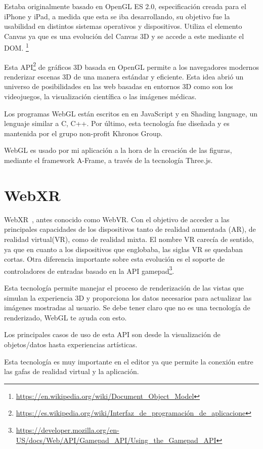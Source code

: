 \documentclass[a4paper, 12pt]{book}
\begin{document}
Estaba originalmente basado en OpenGL ES 2.0, especificación creada para el iPhone y iPad, a medida que esta se iba desarrollando, su objetivo fue la usabilidad en distintos sistemas operativos y dispositivos. Utiliza el elemento Canvas ya que es una evolución del Canvas 3D y se accede a este mediante el DOM. \footnote{\url{https://en.wikipedia.org/wiki/Document_Object_Model}}

Esta API\footnote{\url{https://es.wikipedia.org/wiki/Interfaz_de_programación_de_aplicacione}} de gráficos 3D basada en OpenGL permite a los navegadores modernos renderizar escenas 3D de una manera estándar y eficiente. Esta idea abrió un universo de posibilidades en las web basadas en entornos 3D como son los videojuegos, la visualización científica o las imágenes médicas. 

Los programas WebGL están escritos en en JavaScript y en Shading language, un lenguaje similar a C, C++. Por último, esta tecnología fue diseñada y es mantenida por el grupo non-profit Khronos Group.

WebGL es usado por mi aplicación a la hora de la creación de las figuras, mediante el framework A-Frame, a través de la tecnología Three.js.

\section{WebXR} %
\label{sec:WebXR}
WebXR~\cite{webXR}, antes conocido como WebVR. Con el objetivo de acceder a las principales capacidades de los dispositivos tanto de realidad aumentada (AR), de realidad virtual(VR), como de realidad mixta. El nombre VR carecía de sentido, ya que en cuanto a los dispositivos que englobaba, las siglas VR se quedaban cortas. Otra diferencia importante sobre esta evolución es el soporte de controladores de entradas basado en la API gamepad\footnote{\url{https://developer.mozilla.org/en-US/docs/Web/API/Gamepad_API/Using_the_Gamepad_API}}.

Esta tecnología permite manejar el proceso de renderización de las vistas que simulan la experiencia 3D y proporciona los datos necesarios para actualizar las imágenes mostradas al usuario. Se debe tener claro que no es una tecnología de renderizado, WebGL te ayuda con esto.

Los principales casos de uso de esta API son desde la visualización de objetos/datos hasta experiencias artísticas. 

Esta tecnología es muy importante en el editor ya que permite la conexión entre las gafas de realidad virtual y la aplicación.
\end{document}
